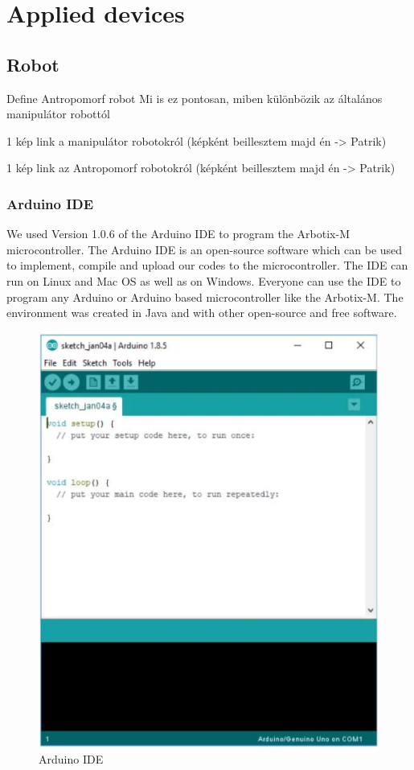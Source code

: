 
\chapter{Applied devices}

\section{Robot}

	Define Antropomorf robot
		Mi is ez pontosan, miben különbözik az általános manipulátor robottól
		
		1 kép link a manipulátor robotokról (képként beillesztem majd én -> Patrik)
		
		1 kép link az Antropomorf robotokról (képként beillesztem majd én -> Patrik)

	\subsection{Arduino IDE}
	
		\hspace{15pt}We used Version 1.0.6 of the Arduino IDE to program the Arbotix-M microcontroller. The Arduino IDE is an open-source software which can be used to implement, compile and upload our codes to the microcontroller. The IDE can run on Linux and Mac OS as well as on Windows. Everyone can use the IDE to program any Arduino or Arduino based microcontroller like the Arbotix-M. The environment was created in Java and with other open-source and free software.
	
			\begin{figure}[ht]
				\centering
				\includegraphics[scale=0.65]{./images/arduino_ide}
				\caption{Arduino IDE \cite{arduino_ide}}
			\end{figure}
			
